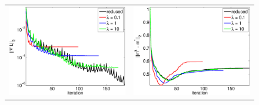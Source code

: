 \documentclass{iopart}
\begin{document}
\begin{figure}
\centering
\begin{tabular}{cc}
\includegraphics[scale=.3]{./figs/2D_exp3_b}&
\includegraphics[scale=.3]{./figs/2D_exp3_c}\\
\end{tabular}
\centering
\begin{tabular}{cccc}

\end{tabular}
\end{figure}
\end{document}
